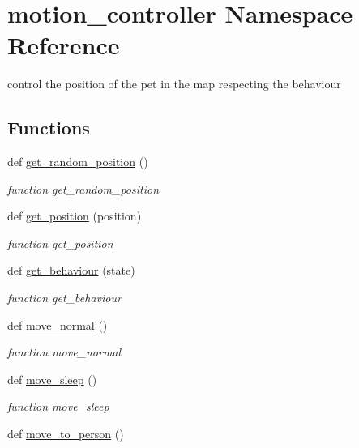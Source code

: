 \hypertarget{namespacemotion__controller}{}\section{motion\+\_\+controller Namespace Reference}
\label{namespacemotion__controller}


control the position of the pet in the map respecting the behaviour  


\subsection*{Functions}
\begin{DoxyCompactItemize}
\item 
def \hyperlink{namespacemotion__controller_a8a8e2917c2712d2afb49419c6aa1379d}{get\+\_\+random\+\_\+position} ()
\begin{DoxyCompactList}\small\item\em function get\+\_\+random\+\_\+position \end{DoxyCompactList}\item 
def \hyperlink{namespacemotion__controller_ad8b145f02fe5a2855d870dcba1fcc55c}{get\+\_\+position} (position)
\begin{DoxyCompactList}\small\item\em function get\+\_\+position \end{DoxyCompactList}\item 
def \hyperlink{namespacemotion__controller_a40fc810329104a6303a97e168e610c49}{get\+\_\+behaviour} (state)
\begin{DoxyCompactList}\small\item\em function get\+\_\+behaviour \end{DoxyCompactList}\item 
def \hyperlink{namespacemotion__controller_ad0d79d45374055e40016deb85d442b68}{move\+\_\+normal} ()
\begin{DoxyCompactList}\small\item\em function move\+\_\+normal \end{DoxyCompactList}\item 
def \hyperlink{namespacemotion__controller_aa7f1f1344aaf5e6d83f0969cd68f4d85}{move\+\_\+sleep} ()
\begin{DoxyCompactList}\small\item\em function move\+\_\+sleep \end{DoxyCompactList}\item 
def \hyperlink{namespacemotion__controller_a539bdfd40405e3ecb739d369e9ab8c5a}{move\+\_\+to\+\_\+person} ()

\end{DoxyCompactItemize}
